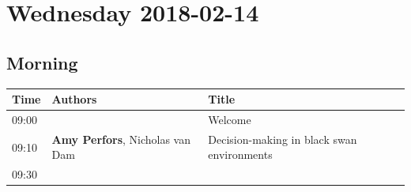 \documentclass[]{article}
\begin{document}
\newpage

\renewcommand{\arraystretch}{1.5}

\pagebreak  

\section{Wednesday 2018-02-14}\label{wednesday-2018-02-14}

\subsection{Morning}\label{morning}

\begin{longtable}[]{@{}lll@{}}
\toprule
\begin{minipage}[b]{0.03\columnwidth}\raggedright\strut
Time\strut
\end{minipage} & \begin{minipage}[b]{0.38\columnwidth}\raggedright\strut
Authors\strut
\end{minipage} & \begin{minipage}[b]{0.51\columnwidth}\raggedright\strut
Title\strut
\end{minipage}\tabularnewline
\midrule
\endhead
\begin{minipage}[t]{0.03\columnwidth}\raggedright\strut
09:00\strut
\end{minipage} & \begin{minipage}[t]{0.38\columnwidth}\raggedright\strut
\strut
\end{minipage} & \begin{minipage}[t]{0.51\columnwidth}\raggedright\strut
Welcome\strut
\end{minipage}\tabularnewline
\begin{minipage}[t]{0.03\columnwidth}\raggedright\strut
09:10\strut
\end{minipage} & \begin{minipage}[t]{0.38\columnwidth}\raggedright\strut
\textbf{Amy Perfors}, Nicholas van Dam\strut
\end{minipage} & \begin{minipage}[t]{0.51\columnwidth}\raggedright\strut
Decision-making in black swan environments\strut
\end{minipage}\tabularnewline
\begin{minipage}[t]{0.03\columnwidth}\raggedright\strut
09:30\strut
\end{minipage} & \begin{minipage}[t]{0.38\columnwidth}\raggedright\strut

\end{minipage}
\end{longtable}
\end{document}
